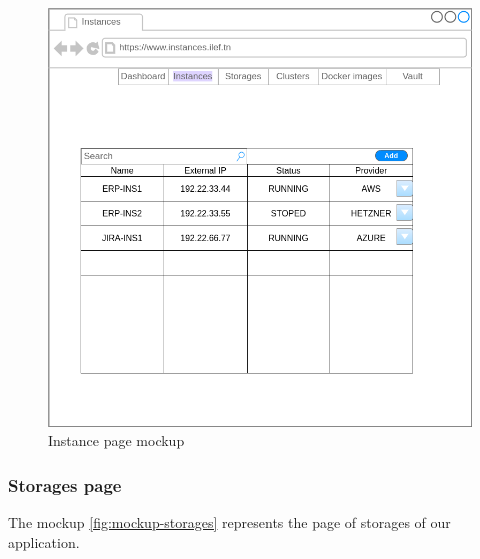 \begin{figure}[h]
  \center
  \includegraphics[width=13cm]{mockup-instances.png}
  \caption{Instance page mockup}
  \label{fig:mockup-instances}
\end{figure}

\subsubsection{Storages page}

The mockup \hyperref[fig:mockup-storages]{\ref{fig:mockup-storages}} represents the page of storages of our application.


